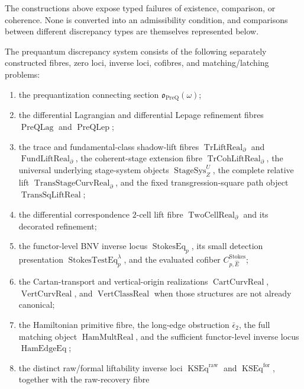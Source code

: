 The constructions above expose typed failures of existence, comparison, or
coherence.  None is converted into an admissibility condition, and comparisons
between different discrepancy types are themselves represented below.

\begin{definition}
\label{def:prequantum-discrepancies}
The prequantum discrepancy system consists of the following separately
constructed fibres, zero loci, inverse loci, cofibres, and matching/latching
problems:
\begin{enumerate}
\item the prequantization connecting section
      $\mathfrak o_{\mathrm{PreQ}}(\omega)$;
\item the differential Lagrangian and differential Lepage refinement fibres
      $\operatorname{PreQLag}$ and $\operatorname{PreQLep}$;
\item the trace and fundamental-class shadow-lift fibres
      $\operatorname{TrLiftReal}_{\partial}$ and
      $\operatorname{FundLiftReal}_{\partial}$, the coherent-stage extension
      fibre $\operatorname{TrCohLiftReal}_{\partial}$, the universal underlying
      stage-system objects $\operatorname{StageSys}_Z^U$, the complete relative
      lift $\operatorname{TransStageCurvReal}_{\partial}$, and the fixed
      transgression-square path object $\operatorname{TransSqLiftReal}$;
\item the differential correspondence $2$-cell lift fibre
      $\operatorname{TwoCellReal}_{\partial}$ and its decorated refinement;
\item the functor-level BNV inverse locus $\operatorname{StokesEq}_p$, its small
      detection presentation $\operatorname{StokesTestEq}_p^\lambda$, and the
      evaluated cofiber $C^{\mathrm{Stokes}}_{p,\widehat E}$;
\item the Cartan-transport and vertical-origin realizations
      $\operatorname{CartCurvReal}$, $\operatorname{VertCurvReal}$, and
      $\operatorname{VertClassReal}$ when those structures are not already canonical;
\item the Hamiltonian primitive fibre, the long-edge obstruction
      $\bar\epsilon_2$, the full matching object
      $\operatorname{HamMultReal}$, and the sufficient functor-level inverse
      locus $\operatorname{HamEdgeEq}$;
\item the distinct raw/formal liftability
      inverse loci $\operatorname{KSEq}^{\mathrm{raw}}$ and
      $\operatorname{KSEq}^{\mathrm{for}}$, together with the raw-recovery fibre

\end{enumerate}
\end{definition}
